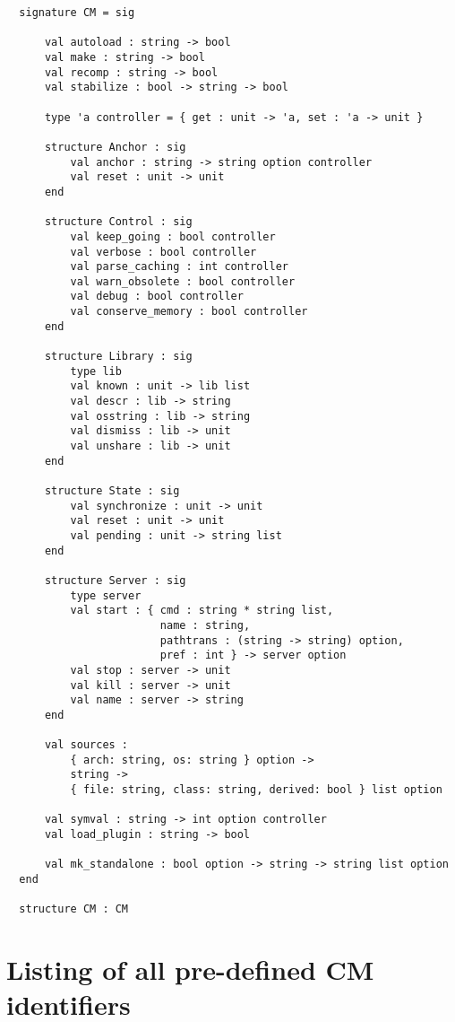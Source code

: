 \documentclass[titlepage,letterpaper]{article}
\begin{document}
\begin{small}
\begin{verbatim}
  signature CM = sig

      val autoload : string -> bool
      val make : string -> bool
      val recomp : string -> bool
      val stabilize : bool -> string -> bool

      type 'a controller = { get : unit -> 'a, set : 'a -> unit }

      structure Anchor : sig
          val anchor : string -> string option controller
          val reset : unit -> unit
      end

      structure Control : sig
          val keep_going : bool controller
          val verbose : bool controller
          val parse_caching : int controller
          val warn_obsolete : bool controller
          val debug : bool controller
          val conserve_memory : bool controller
      end

      structure Library : sig
          type lib
          val known : unit -> lib list
          val descr : lib -> string
          val osstring : lib -> string
          val dismiss : lib -> unit
          val unshare : lib -> unit
      end

      structure State : sig
          val synchronize : unit -> unit
          val reset : unit -> unit
          val pending : unit -> string list
      end

      structure Server : sig
          type server
          val start : { cmd : string * string list,
                        name : string,
                        pathtrans : (string -> string) option,
                        pref : int } -> server option
          val stop : server -> unit
          val kill : server -> unit
          val name : server -> string
      end

      val sources :
          { arch: string, os: string } option ->
          string ->
          { file: string, class: string, derived: bool } list option

      val symval : string -> int option controller
      val load_plugin : string -> bool

      val mk_standalone : bool option -> string -> string list option
  end

  structure CM : CM
\end{verbatim}
\end{small}

\section{Listing of all pre-defined CM identifiers}
\end{document}
